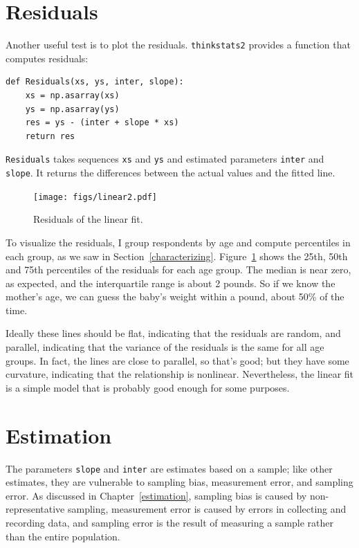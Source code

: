 \documentclass[12pt]{book}
\theoremstyle{exercise}
\begin{document}
\section{Residuals}%
\label{residuals}

Another useful test is to plot the residuals.
{\tt thinkstats2} provides a function that computes residuals:%

\begin{verbatim}
def Residuals(xs, ys, inter, slope):
    xs = np.asarray(xs)
    ys = np.asarray(ys)
    res = ys - (inter + slope * xs)
    return res
\end{verbatim}

{\tt Residuals} takes sequences {\tt xs} and {\tt ys} and
estimated parameters {\tt inter} and {\tt slope}.  It returns
the differences between the actual values and the fitted line.

\begin{figure}
\centerline{\texttt{[image: figs/linear2.pdf]}}
\caption{Residuals of the linear fit.}%
\label{linear2}
\end{figure}

To visualize the residuals, I group respondents by age and compute
percentiles in each group, as we saw in Section~\ref{characterizing}.
Figure~\ref{linear2} shows the 25th, 50th and 75th percentiles of
the residuals for each age group.  The median is near zero, as
expected, and the interquartile range is about 2 pounds.  So if we
know the mother's age, we can guess the baby's weight within a pound,
about 50\% of the time.%

Ideally these lines should be flat, indicating that the residuals are
random, and parallel, indicating that the variance of the residuals is
the same for all age groups.  In fact, the lines are close to
parallel, so that's good; but they have some curvature, indicating
that the relationship is nonlinear.  Nevertheless, the linear fit
is a simple model that is probably good enough for some purposes.%
%


\section{Estimation}%
\label{regest}

The parameters {\tt slope} and {\tt inter} are estimates based on a
sample; like other estimates, they are vulnerable to sampling bias,
measurement error, and sampling error.  As discussed in
Chapter~\ref{estimation}, sampling bias is caused by non-representative
sampling, measurement error is caused by errors in collecting
and recording data, and sampling error is the result of measuring a
sample rather than the entire population.%
%
%
%
%
\end{document}
